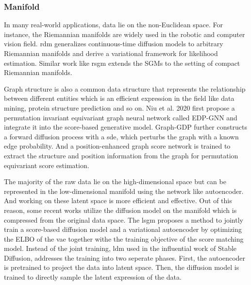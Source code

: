 \documentclass[12pt,DIV14,BCOR12mm,a4paper,footinclude=false,headinclude,parskip=half-,twoside,openright,cleardoublepage=empty,toc=index,bibliography=totoc,listof=totoc]{scrreprt}
\numberwithin{equation}{chapter}
\begin{document}
\subsubsection{Manifold}
In many real-world applications, data lie on the non-Euclidean space. For instance, the Riemannian manifolds are widely used in the robotic and computer vision field. \gls{rdm} \cite{huang2022riemannian} generalizes continuous-time diffusion models to arbitrary Riemannian manifolds and derive a variational framework for likelihood estimation. Similar work like \gls{rsgm} \cite{debortoli2022riemannian} extends the SGMs to the setting of compact Riemannian manifolds.

Graph structure is also a common data structure that represents the relationship between different entities which is an efficient expression in the field like data mining,  protein structure prediction and so on. Niu et al. 2020 \cite{niu2020permutation} first propose a permutation invariant equivariant graph neural network called EDP-GNN and integrate it into the score-based generative model. Graph-GDP \cite{huang2022graphgdp} further constructs a forward diffusion process with a \gls{sde}, which perturbs the graph with a known edge probability. And a position-enhanced graph score network is trained to extract the structure and position information from the graph for permutation equivariant score estimation.

The majority of the raw data lie on the high-dimensional space but can be represented in the low-dimensional manifold using the network like autoencoder. And working on these latent space is more efficient and effective. Out of this reason, some recent works utilize the diffusion model on the manifold which is compressed from the original data space. The \gls{lsgm} \cite{vahdat2021scorebased} proposes a method to jointly train a score-based diffusion model and a variational autoencoder by optimizing the ELBO of the \gls{vae} together withe the training objective of the score matching model. Instead of the joint training, \gls{ldm} \cite{rombach2022highresolution} used in the influential work of Stable Diffusion, addresses the training into two seperate phases. First, the autoencoder is pretrained to project the data into latent space. Then, the diffusion model is trained to directly sample the latent expression of the data.
\end{document}
